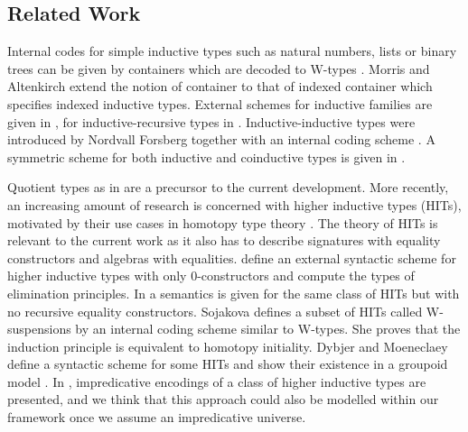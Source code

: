 \documentclass[acmsmall,screen]{acmart}
\begin{document}

\subsection{Related Work}
\label{sec:related-work}



Internal codes for simple inductive types such as natural numbers,
lists or binary trees can be given by containers which are decoded to
W-types \cite{abbot05containers}. Morris and Altenkirch
\cite{morris09indexed} extend the notion of container to that of
indexed container which specifies indexed inductive types. External
schemes for inductive families are given in
\cite{Dybjer97inductivefamilies,paulinmohring}, for
inductive-recursive types in \cite{dybjer00ir}. Inductive-inductive
types were introduced by Nordvall Forsberg together with an internal
coding scheme \cite{forsberg-phd}. A symmetric scheme for both
inductive and coinductive types is given in \cite{henning}.

Quotient types as in \cite{hofmann95extensional} are a precursor to
the current development. More recently, an increasing amount of
research is concerned with higher inductive types (HITs), motivated by
their use cases in homotopy type theory \cite{HoTTbook}. The theory of
HITs is relevant to the current work as it also has to describe
signatures with equality constructors and algebras with
equalities. \cite{niels} define an external syntactic scheme for
higher inductive types with only 0-constructors and compute the types
of elimination principles. In \cite{nielsmsc} a semantics is given for
the same class of HITs but with no recursive equality
constructors. Sojakova \cite{sojakova} defines a subset of HITs called
W-suspensions by an internal coding scheme similar to W-types. She
proves that the induction principle is equivalent to homotopy
initiality. Dybjer and Moeneclaey define a syntactic scheme for some
HITs and show their existence in a groupoid model
\cite{moeneclaey}. In \cite{AwodeyFS18}, impredicative encodings of a
class of higher inductive types are presented, and we think that this
approach could also be modelled within our framework once we assume an
impredicative universe.
\end{document}
